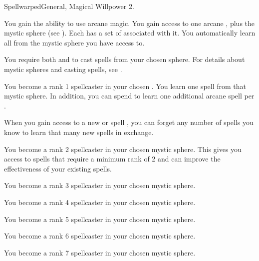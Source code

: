   \begin{magicalfeat}{Spellwarped}{General, Magical}
    \featpre Willpower 2.

     You gain the ability to use arcane magic.
    You gain access to one arcane , plus the  mystic sphere (see ).
    Each  has a set of  associated with it.
    You automatically learn all  from the mystic sphere you have access to.

    You require both  and  to cast spells from your chosen sphere.
    For details about mystic spheres and casting spells, see .

     You become a rank 1 spellcaster in your chosen .
    You learn one spell from that mystic sphere.
    In addition, you can spend  to learn one additional arcane spell per .

    When you gain access to a new  or spell ,
    you can forget any number of spells you know to learn that many new spells in exchange.

     You become a rank 2 spellcaster in your chosen mystic sphere.
    This gives you access to spells that require a minimum rank of 2 and can improve the effectiveness of your existing spells.

     You become a rank 3 spellcaster in your chosen mystic sphere.

     You become a rank 4 spellcaster in your chosen mystic sphere.

     You become a rank 5 spellcaster in your chosen mystic sphere.

     You become a rank 6 spellcaster in your chosen mystic sphere.

     You become a rank 7 spellcaster in your chosen mystic sphere.
  \end{magicalfeat}

